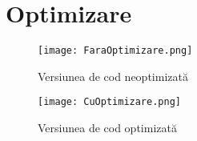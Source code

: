 \section{Optimizare}

\begin{figure}[H]
   	\centering
    	\texttt{[image: FaraOptimizare.png]}
	\caption{Versiunea de cod neoptimizată}
\end{figure}

\begin{figure}[H]
   	\centering
    	\texttt{[image: CuOptimizare.png]}
	\caption{Versiunea de cod optimizată}
\end{figure}

